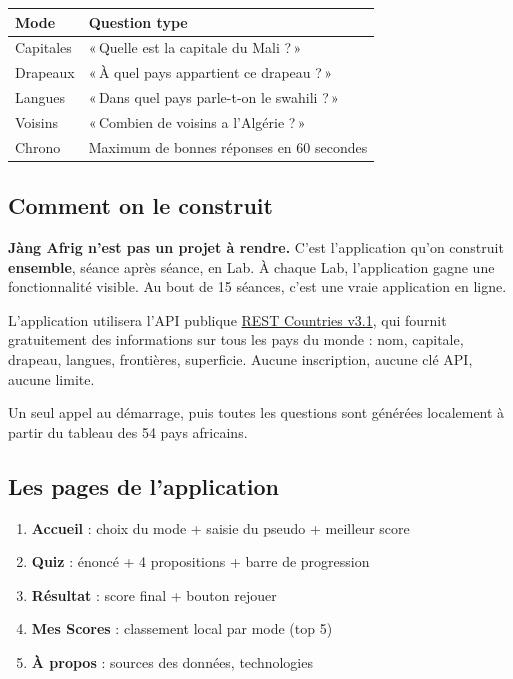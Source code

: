 \documentclass[11pt,a4paper]{article}
\begin{document}
\begin{center}
\begin{tabular}{ll}
\toprule
\textbf{Mode} & \textbf{Question type} \\
\midrule
Capitales      & «\,Quelle est la capitale du Mali ?\,» \\
Drapeaux       & «\,À quel pays appartient ce drapeau ?\,» \\
Langues        & «\,Dans quel pays parle-t-on le swahili ?\,» \\
Voisins        & «\,Combien de voisins a l'Algérie ?\,» \\
Chrono         & Maximum de bonnes réponses en 60 secondes \\
\bottomrule
\end{tabular}
\end{center}

\subsection{Comment on le construit}

\textbf{Jàng Afrig n'est pas un projet à rendre.} C'est l'application qu'on
construit \textbf{ensemble}, séance après séance, en Lab. À chaque Lab,
l'application gagne une fonctionnalité visible. Au bout de 15 séances,
c'est une vraie application en ligne.

\begin{projetbox}
L'application utilisera l'API publique \href{https://restcountries.com}{REST
Countries v3.1}, qui fournit gratuitement des informations sur tous les pays
du monde : nom, capitale, drapeau, langues, frontières, superficie. Aucune
inscription, aucune clé API, aucune limite.

Un seul appel au démarrage, puis toutes les questions sont générées
localement à partir du tableau des 54 pays africains.
\end{projetbox}

\subsection{Les pages de l'application}

\begin{enumerate}[nosep]
    \item \textbf{Accueil} : choix du mode + saisie du pseudo + meilleur score
    \item \textbf{Quiz} : énoncé + 4 propositions + barre de progression
    \item \textbf{Résultat} : score final + bouton rejouer
    \item \textbf{Mes Scores} : classement local par mode (top 5)
    \item \textbf{À propos} : sources des données, technologies
\end{enumerate}
\end{document}
